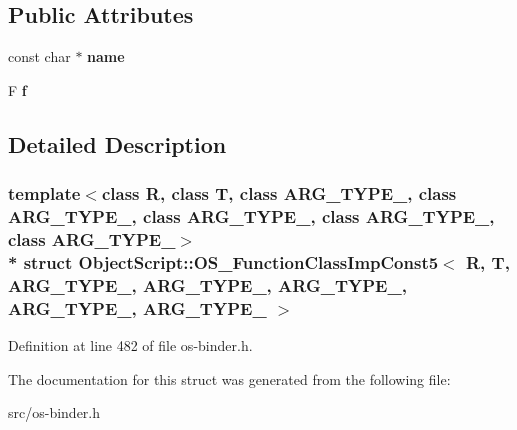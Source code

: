 \subsection*{Public Attributes}
\begin{DoxyCompactItemize}
\item 
const char $\ast$ {\bfseries name}\hypertarget{struct_object_script_1_1_o_s___function_class_imp_const5_a5a55aabcb00347f46325871e5d777faa}{}\label{struct_object_script_1_1_o_s___function_class_imp_const5_a5a55aabcb00347f46325871e5d777faa}

\item 
F {\bfseries f}\hypertarget{struct_object_script_1_1_o_s___function_class_imp_const5_a5e856bf952773feb3ab41ccd4f765097}{}\label{struct_object_script_1_1_o_s___function_class_imp_const5_a5e856bf952773feb3ab41ccd4f765097}

\end{DoxyCompactItemize}


\subsection{Detailed Description}
\subsubsection*{template$<$class R, class T, class A\+R\+G\+\_\+\+T\+Y\+P\+E\+\_, class A\+R\+G\+\_\+\+T\+Y\+P\+E\+\_, class A\+R\+G\+\_\+\+T\+Y\+P\+E\+\_, class A\+R\+G\+\_\+\+T\+Y\+P\+E\+\_, class A\+R\+G\+\_\+\+T\+Y\+P\+E\+\_$>$\\*
struct Object\+Script\+::\+O\+S\+\_\+\+Function\+Class\+Imp\+Const5$<$ R, T, A\+R\+G\+\_\+\+T\+Y\+P\+E\+\_, A\+R\+G\+\_\+\+T\+Y\+P\+E\+\_, A\+R\+G\+\_\+\+T\+Y\+P\+E\+\_, A\+R\+G\+\_\+\+T\+Y\+P\+E\+\_, A\+R\+G\+\_\+\+T\+Y\+P\+E\+\_ $>$}



Definition at line 482 of file os-\/binder.\+h.



The documentation for this struct was generated from the following file\+:\begin{DoxyCompactItemize}
\item 
src/os-\/binder.\+h\end{DoxyCompactItemize}
